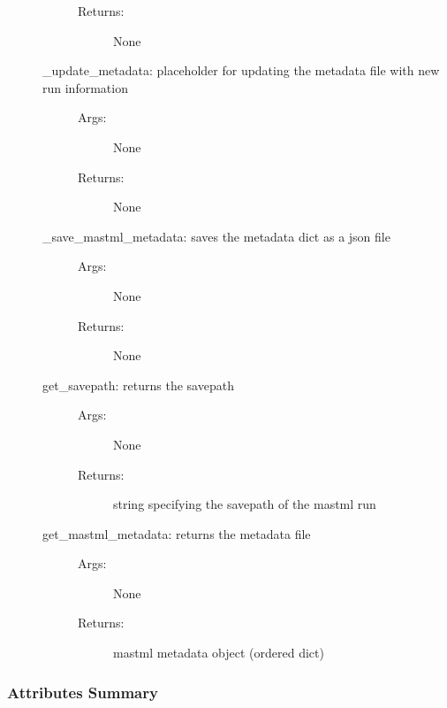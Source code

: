 \documentclass[letterpaper,10pt,english]{sphinxmanual}
\begin{document}
\begin{fulllineitems}
\begin{description}
\begin{description}
\begin{description}
\item[{Returns:}] \leavevmode
None

\end{description}

\item[{\_update\_metadata: placeholder for updating the metadata file with new run information}] \leavevmode\begin{description}
\item[{Args:}] \leavevmode
None

\item[{Returns:}] \leavevmode
None

\end{description}

\item[{\_save\_mastml\_metadata: saves the metadata dict as a json file}] \leavevmode\begin{description}
\item[{Args:}] \leavevmode
None

\item[{Returns:}] \leavevmode
None

\end{description}

\item[{get\_savepath: returns the savepath}] \leavevmode\begin{description}
\item[{Args:}] \leavevmode
None

\item[{Returns:}] \leavevmode
string specifying the savepath of the mastml run

\end{description}

\item[{get\_mastml\_metadata: returns the metadata file}] \leavevmode\begin{description}
\item[{Args:}] \leavevmode
None

\item[{Returns:}] \leavevmode
mastml metadata object (ordered dict)

\end{description}

\end{description}

\end{description}
\subsubsection*{Attributes Summary}



\end{fulllineitems}
\end{document}

